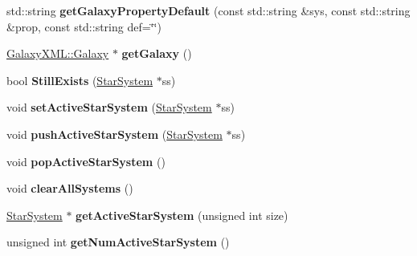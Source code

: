\begin{DoxyCompactItemize}
\item 
std\+::string {\bfseries get\+Galaxy\+Property\+Default} (const std\+::string \&sys, const std\+::string \&prop, const std\+::string def=\char`\"{}\char`\"{})\hypertarget{classUniverse_ae2c6ff440579e88f6eda381fa4ee0504}{}\label{classUniverse_ae2c6ff440579e88f6eda381fa4ee0504}

\item 
\hyperlink{classGalaxyXML_1_1Galaxy}{Galaxy\+X\+M\+L\+::\+Galaxy} $\ast$ {\bfseries get\+Galaxy} ()\hypertarget{classUniverse_a900f9aa0990440f655c94e7a9980252c}{}\label{classUniverse_a900f9aa0990440f655c94e7a9980252c}

\item 
bool {\bfseries Still\+Exists} (\hyperlink{classStarSystem}{Star\+System} $\ast$ss)\hypertarget{classUniverse_a007287a48f0ecb4da7ef17b62b25943d}{}\label{classUniverse_a007287a48f0ecb4da7ef17b62b25943d}

\item 
void {\bfseries set\+Active\+Star\+System} (\hyperlink{classStarSystem}{Star\+System} $\ast$ss)\hypertarget{classUniverse_a8202e678afb5a3328d037ef7a3f99375}{}\label{classUniverse_a8202e678afb5a3328d037ef7a3f99375}

\item 
void {\bfseries push\+Active\+Star\+System} (\hyperlink{classStarSystem}{Star\+System} $\ast$ss)\hypertarget{classUniverse_a8e4e96fccac1693f315e481950fe77a7}{}\label{classUniverse_a8e4e96fccac1693f315e481950fe77a7}

\item 
void {\bfseries pop\+Active\+Star\+System} ()\hypertarget{classUniverse_a67a104f1726422128948be5483aec594}{}\label{classUniverse_a67a104f1726422128948be5483aec594}

\item 
void {\bfseries clear\+All\+Systems} ()\hypertarget{classUniverse_ada85785d8b24da2ce203435a64db0f43}{}\label{classUniverse_ada85785d8b24da2ce203435a64db0f43}

\item 
\hyperlink{classStarSystem}{Star\+System} $\ast$ {\bfseries get\+Active\+Star\+System} (unsigned int size)\hypertarget{classUniverse_ad8892472932657a68e23beed86695964}{}\label{classUniverse_ad8892472932657a68e23beed86695964}

\item 
unsigned int {\bfseries get\+Num\+Active\+Star\+System} ()\hypertarget{classUniverse_aded81b19908962ff3bc978ec2c862d58}{}\label{classUniverse_aded81b19908962ff3bc978ec2c862d58}


\end{DoxyCompactItemize}
